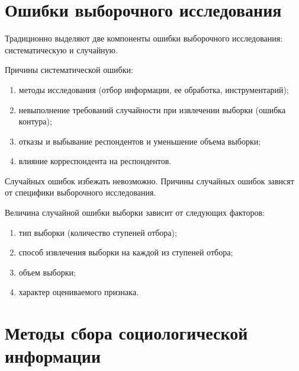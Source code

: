   \section{Ошибки выборочного исследования}

    Традиционно выделяют две компоненты ошибки выборочного исследования:
    систематическую и случайную.

    Причины систематической ошибки:
    \begin{enumerate}
      \item методы исследования (отбор информации, ее обработка,
        инструментарий);
      \item невыполнение требований случайности при извлечении выборки (ошибка
        контура);
      \item отказы и выбывание респондентов и уменьшение объема выборки;
      \item влияние корреспондента на респондентов.
    \end{enumerate}

    Случайных ошибок избежать невозможно. Причины случайных ошибок зависят от
    специфики выборочного исследования.

    Величина случайной ошибки выборки зависит от следующих факторов:
    \begin{enumerate}
      \item тип выборки (количество ступеней отбора);
      \item способ извлечения выборки на каждой из ступеней отбора;
      \item объем выборки;
      \item характер оцениваемого признака.
    \end{enumerate}

  \section{Методы сбора социологической информации}

